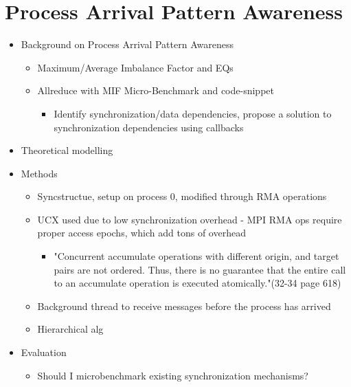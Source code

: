 
\glsresetall %
\chapter[PAPAwareness]{Process Arrival Pattern Awareness}\label{ch:PAPAwareness}

\begin{itemize}
    \item Background on Process Arrival Pattern Awareness
    \begin{itemize}
        \item Maximum/Average Imbalance Factor and EQs
        \item Allreduce with MIF Micro-Benchmark and code-snippet
        \begin{itemize}
            \item Identify synchronization/data dependencies, propose a solution to synchronization dependencies using callbacks \cite{Luo2018ADAPT}
        \end{itemize}
    \end{itemize}
    \item Theoretical modelling
    \item Methods
    \begin{itemize}
        \item Syncstructue, setup on process 0, modified through RMA operations
        \item UCX used due to low synchronization overhead - MPI RMA ops require proper access epochs, which add tons of overhead
        \begin{itemize}
            \item "Concurrent accumulate operations with different origin, and target pairs are
not ordered. Thus, there is no guarantee that the entire call to an accumulate operation is
executed atomically."(32-34 page 618)
        \end{itemize}
        \item Background thread to receive messages before the process has arrived 
        \item Hierarchical alg 
    \end{itemize}
    \item Evaluation
    \begin{itemize}
        \item Should I microbenchmark existing synchronization mechanisms?

\end{itemize}
\end{itemize}

